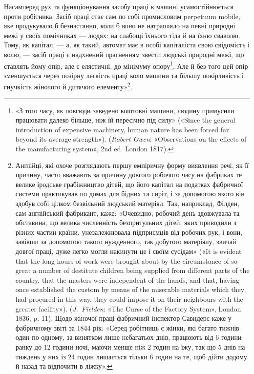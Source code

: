 Насамперед рух та функціонування засобу праці в машині
усамостійнюється проти робітника. Засіб праці стає сам по собі
промисловим perpetuum mobile, яке продукувало б безнастанно,
коли б воно не натрапляло на певні природні межі у своїх помічниках
— людях: на слабощі їхнього тіла й на їхню сваволю.
Тому, як капітал, — а, як такий, автомат має в особі капіталіста
свою свідомість і волю, — засіб праці є надхнений прагненням
звести людські природні межі, що ставлять йому опір, але є елястичні,
до мінімуму опору\footnote{
«З того часу, як повсюди заведено коштовні машини, людину
примусили працювати далеко більше, ніж їй пересічно під силу» («Sіnce
the general introduction of expensive machinery, human nature has been
forced far beyond its average strength»). (\emph{Robert Owen}: «Observations
on the effects of the manufacturing system», 2nd ed. London 1817).
}. Але й без того цей опір зменшується
через позірну легкість праці коло машини та більшу покірливість
і гнучкість жіночого й дитячого елементу»\footnote{
Англійці, які охоче розглядають першу емпіричну форму виявлення
речі, як її причину, часто вважають за причину довгого робочого
часу на фабриках те велике іродське грабіжництво дітей, що його капітал
на податках фабричної системи практикував по домах для бідних та
сиріт, і за допомогою якого він здобув собі цілком безвільний людський
матеріял. Так, наприклад, Філден, сам англійський фабрикант, каже:
«Очевидно, робочий день здовжувала та обставина, що велика численність
безпритульних дітей, яких приводили з різних частин країни, унезалежнювала
підприємців від робочих рук, і вони, завівши за допомогою такого
нужденного, так добутого матеріялу, звичай довгої праці, дуже легко
могли накинути це і своїм сусідам» («It is evident that the long hours of
work were brought about by the circumstance of so great a number of destitute
children being supplied from different parts of the country, that the
masters were independent of the hands, and that, having once established
the custom by means of the miserable materials which they had procured in
this way, they could impose it on their neighbours with the greater facility»).
(\emph{J.~Fielden}: «The Curse of the Factory System», London 1836, p. 11). Щодо жіночої
праці фабричний інспектор Савндерс каже у фабричному
звіті за 1844 рік: «Серед робітниць є жінки, які багато тижнів один по
одному, за винятком лише небагатьох днів, працюють від 6 години ранку
до 12 години ночі, маючи менше ніж 2 годин на їжу, так що 5 днів на тиждень
у них із 24 годин лишається тільки 6 годин на те, щоб дійти додому
й назад та відпочити в ліжку».}.

